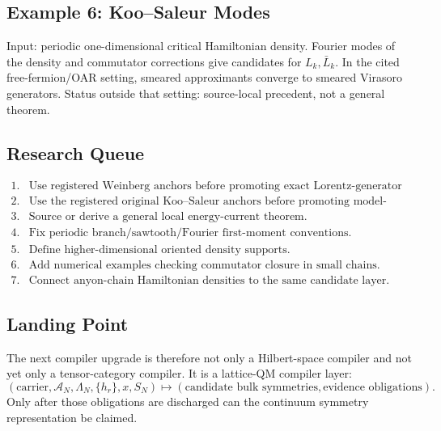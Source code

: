 \subsection{Example 6: Koo--Saleur Modes}

Input: periodic one-dimensional critical Hamiltonian density.  Fourier modes of
the density and commutator corrections give candidates for \(L_k,\bar L_k\).
In the cited free-fermion/OAR setting, smeared approximants converge to smeared
Virasoro generators.  Status outside that setting: source-local precedent, not a
general theorem.

\subsection{Research Queue}

\[
\begin{array}{ll}
1.&\text{Use registered Weinberg anchors before promoting exact Lorentz-generator formulas.}\\
2.&\text{Use the registered original Koo--Saleur anchors before promoting model-specific KS claims.}\\
3.&\text{Source or derive a general local energy-current theorem.}\\
4.&\text{Fix periodic branch/sawtooth/Fourier first-moment conventions.}\\
5.&\text{Define higher-dimensional oriented density supports.}\\
6.&\text{Add numerical examples checking commutator closure in small chains.}\\
7.&\text{Connect anyon-chain Hamiltonian densities to the same candidate layer.}
\end{array}
\]

\subsection{Landing Point}

The next compiler upgrade is therefore not only a Hilbert-space compiler and not
yet only a tensor-category compiler.  It is a lattice-QM compiler layer:
\[
  (\text{carrier},\mathcal A_N,\Lambda_N,\{h_r\},x,S_N)
  \longmapsto
  (\text{candidate bulk symmetries},\text{evidence obligations}).
\]
Only after those obligations are discharged can the continuum symmetry
representation be claimed.
